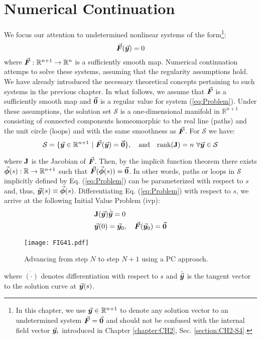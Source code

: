 \section{Numerical Continuation}
We focus our attention to undetermined nonlinear systems of the 
form\footnote{In this chapter, we use $\vec{\bm{y}}\in\mathbb{R}^{n+1}$ to denote 
any solution vector to an undetermined system $\vec{\bm{F}}=\vec{\bm{0}}$ and should 
not be confused with the internal field vector $\vec{\bm{y}}_i$ introduced in 
Chapter \ref{chapter:CH2}, Sec. \ref{section:CH2-S4}.}:
\begin{equation}
	\vec{\bm{F}}(\vec{\bm{y}})=0
	\label{eq:Problem}
\end{equation}
where $\vec{\bm{F}}:\mathbb{R}^{n+1}\rightarrow\mathbb{R}^n$ is a sufficiently 
smooth
map. Numerical continuation attemps to solve these systems, assuming that the 
regularity assumptions hold. We have already introduced the necessary 
theoretical concepts pertaining to such systems in the previous chapter. In 
what follows, we assume that $\vec{\bm{F}}$ is a sufficiently smooth map and 
$\vec{\bm{0}}$ is a regular value for system (\ref{eq:Problem}). Under these 
assumptions, the solution set
$\mathcal{S}$ is a one-dimensional manifold in
$\mathbb{R}^{n+1}$ consisting of connected components homeomorphic to the real
line (paths) and the unit circle (loops) and with the same smoothness as
$\vec{\bm{F}}$. For $\mathcal{S}$ we have:
\begin{equation}
	\mathcal{S}=\{\bvec{y}\in\mathbb{R}^{n+1}\ |\ 
	\bvec{F}(\bvec{y})=\bvec{0}\},\quad \text{and}\quad 
	\text{rank}(\bmat{J})=n\ \forall\bvec{y}\in\mathcal{S}
	\label{eq:SolutionSet}
\end{equation}

\noindent where $\mathbf{J}$ is the Jacobian of $\vec{\bm{F}}$. Then,  by the 
implicit
function theorem there exists 
$\vec{\bm{\phi}}(s):\mathbb{R}\rightarrow\mathbb{R}^{n+1}$
such that $\vec{\bm{F}}(\vec{\bm{\phi}}(s))=\vec{\bm{0}}$. In other words, paths or loops in
$\mathcal{S}$ implicitly defined by Eq. (\ref{eq:Problem}) can be parameterized 
with
respect to $s$ and, thus, $\vec{\bm{y}}(s)\equiv\vec{\bm{\phi}}(s)$. Differentiating Eq.
(\ref{eq:Problem}) with respect to $s$, we arrive
at the following Initial Value Problem (\acrshort{ivp}):
\begin{subequations}
	\begin{align}
		&\mathbf{J}(\vec{\bm{y}})\dot{\vec{\bm{y}}}=0\label{eq:IVP1}\\
		&\vec{\bm{y}}(0)=\vec{\bm{y}}_0,\quad \vec{\bm{F}}(\vec{\bm{y}}_0)=\vec{\bm{0}}	
		\label{eq:IVP2}
	\end{align}
	\label{eq:IVP}
\end{subequations}
\begin{figure}[t]
	\centering
	\texttt{[image: FIG41.pdf]}
	\caption{Advancing from step $N$ to step $N+1$ using a PC approach.}
	\label{fig:FIG41}
\end{figure}
where $\dot{(\cdot)}$ denotes differentiation with respect to $s$ and 
$\dot{\vec{\bm{y}}}$ is the tangent vector to the solution curve at $\vec{\bm{y}}(s)$. 

